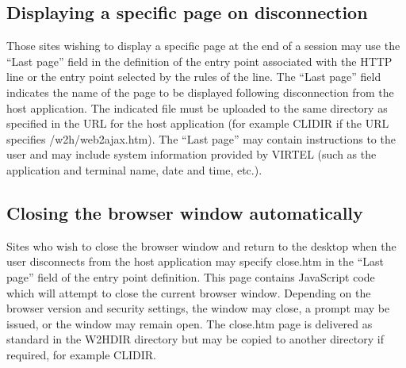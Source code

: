 \documentclass[letterpaper,10pt,english]{sphinxmanual}
\begin{document}
\ignorespaces 

\subsection{Displaying a specific page on disconnection}
\label{\detokenize{Customization:displaying-a-specific-page-on-disconnection}}\label{\detokenize{Customization:index-70}}
\sphinxAtStartPar
Those sites wishing to display a specific page at the end of a session may use the “Last page” field in the definition of the entry point associated with the HTTP line or the entry point selected by the rules of the line. The “Last page” field indicates the name of the page to be displayed following disconnection from the host application. The indicated file
must be uploaded to the same directory as specified in the URL for the host application (for example CLI\sphinxhyphen{}DIR if the URL specifies /w2h/web2ajax.htm). The “Last page” may contain instructions to the user and may include system information provided by VIRTEL (such as the application and terminal name, date and time, etc.).

\ignorespaces 

\subsection{Closing the browser window automatically}
\label{\detokenize{Customization:closing-the-browser-window-automatically}}\label{\detokenize{Customization:index-71}}
\sphinxAtStartPar
Sites who wish to close the browser window and return to the desktop when the user disconnects from the host application may specify close.htm in the “Last page” field of the entry point definition. This page contains JavaScript code which will attempt to close the current browser window. Depending on the browser version and security settings, the window may close, a prompt may be issued, or the window may remain open. The close.htm page is delivered as standard in the W2H\sphinxhyphen{}DIR directory but may be copied to another directory if required, for example CLI\sphinxhyphen{}DIR.
\end{document}
